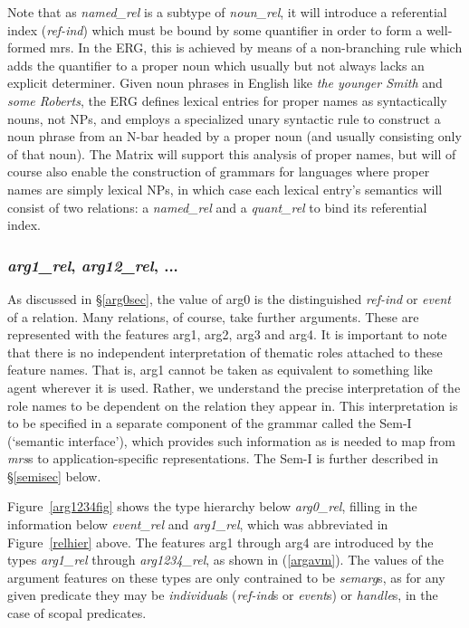 \documentclass[12pt]{article}
\begin{document}
Note that as {\it named\_rel} is a subtype of {\it noun\_rel}, it
will introduce a referential index ({\it ref-ind}) which must
be bound by some quantifier in order to form a well-formed mrs.
In the ERG, this is achieved by means of a non-branching rule
which adds the quantifier to a proper noun which usually but not always
lacks an explicit determiner.  Given noun phrases in English like {\it the
younger Smith} and {\it some Roberts}, the ERG defines lexical entries
for proper names as syntactically nouns, not NPs, and employs a specialized
unary syntactic rule to construct a noun phrase from an N-bar headed by
a proper noun (and usually consisting only of that noun).  The Matrix will
support this analysis of proper names, but will of course also enable the
construction of grammars for languages where proper names are simply lexical 
NPs, in which case each lexical entry's semantics will consist of two
relations: a {\it named\_rel} and a {\it quant\_rel} to bind its referential
index.

\subsubsection{{\it arg1\_rel}, {\it arg12\_rel}, ...}

As discussed in \S\ref{arg0sec}, the value of {\sc arg0} is the
distinguished {\it ref-ind} or {\it event} of a relation.  Many
relations, of course, take further arguments.  These are represented
with the features {\sc arg1}, {\sc arg2}, {\sc arg3} and {\sc arg4}.
It is important to note that there is no independent interpretation
of thematic roles attached to these feature names.  That is, {\sc arg1} 
cannot be taken as equivalent to something like {\sc agent} wherever 
it is used.
Rather, we understand the precise interpretation of the role names to
be dependent on the relation they appear in.  This interpretation is
to be specified in a separate component of the grammar called the
Sem-I (`semantic interface'), which provides such information as is
needed to map from {\it mrs}s to application-specific representations.
The Sem-I is further described in \S\ref{semisec} below.

Figure~\ref{arg1234fig} shows the type hierarchy below {\it arg0\_rel},
filling in the information below {\it event\_rel} and {\it arg1\_rel},
which was abbreviated in Figure~\ref{relhier} above.  The features
{\sc arg1} through {\sc arg4} are introduced by the types {\it
arg1\_rel} through {\it arg1234\_rel}, as shown in (\ref{argavm}).
The values of the argument features on these types are only
contrained to be {\it semarg}s, as for any given predicate
they may be {\it individual}s ({\it ref-ind}s or {\it event}s) or
{\it handle}s, in the case of scopal predicates.
\end{document}
